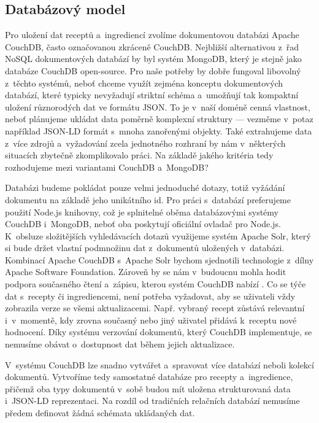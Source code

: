 \subsection{Databázový model}

Pro uložení dat receptů a~ingrediencí zvolíme dokumentovou databázi Apache CouchDB, často označovanou zkráceně CouchDB. Nejbližší alternativou z~řad NoSQL dokumentových databází by byl systém MongoDB, který je stejně jako databáze CouchDB open-source. Pro naše potřeby by dobře fungoval libovolný z~těchto systémů, neboť chceme využít zejména konceptu dokumentových databází, které typicky nevyžadují striktní schéma a~umožňují tak kompaktní uložení různorodých dat ve formátu JSON. To je v~naší doméně cenná vlastnost, neboť plánujeme ukládat data poměrně komplexní struktury --- vezměme v~potaz například JSON-LD formát s~mnoha zanořenými objekty. Také extrahujeme data z~více zdrojů a~vyžadování zcela jednotného rozhraní by nám v~některých situacích zbytečně zkomplikovalo práci. Na základě jakého kritéria tedy rozhodujeme mezi variantami CouchDB a~MongoDB?

Databázi budeme pokládat pouze velmi jednoduché dotazy, totiž vyžádání dokumentu na základě jeho unikátního id. Pro práci s~databází preferujeme použití Node.js knihovny, což je splnitelné oběma databázovými systémy CouchDB i~MongoDB, neboť oba poskytují oficiální ovladač pro Node.js. K~obsluze složitějších vyhledávacích dotazů využijeme systém Apache Solr, který si bude držet vlastní podmnožinu dat z~dokumentů uložených v~databázi. Kombinací Apache CouchDB s~Apache Solr bychom sjednotili technologie z~dílny Apache Software Foundation. Zároveň by se nám v~budoucnu mohla hodit podpora současného čtení a~zápisu, kterou systém CouchDB nabízí \citep{mongodb-vs-couchdb}. Co se týče dat s~recepty či ingrediencemi, není potřeba vyžadovat, aby se uživateli vždy zobrazila verze se všemi aktualizacemi. Např. vybraný recept zůstává relevantní i~v~momentě, kdy zrovna současný nebo jiný uživatel přidává k~receptu nové hodnocení. Díky systému verzování dokumentů, který CouchDB implementuje, se nemusíme obávat o~dostupnost dat během jejich aktualizace.

V~systému CouchDB lze snadno vytvářet a~spravovat více databází neboli kolekcí dokumentů. Vytvoříme tedy samostatné databáze pro recepty a~ingredience, přičemž oba typy dokumentů v~sobě budou mít uložena strukturovaná data i~JSON-LD reprezentaci. Na rozdíl od tradičních relačních databází nemusíme předem definovat žádná schémata ukládaných dat.

